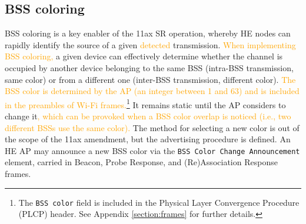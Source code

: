 \documentclass{ieeeaccess}
\begin{document}
\subsection{BSS coloring}	
\label{section:bss_coloring}	
BSS coloring is a key enabler of the 11ax SR operation, whereby HE nodes can rapidly identify the source of a given \textcolor{orange}{detected} transmission. \textcolor{orange}{When implementing BSS coloring,} a given device can effectively determine whether the channel is occupied by another device belonging to the same BSS (intra-BSS transmission, same color) or from a different one (inter-BSS transmission, different color). \textcolor{orange}{The BSS color is determined by the AP (an integer between 1 and 63) and is included in the preambles of Wi-Fi frames.}\footnote{The \texttt{BSS color} field is included in the Physical Layer Convergence Procedure (PLCP) header. See Appendix \ref{section:frames} for further details.} It remains static until the AP considers to change it\textcolor{orange}{, which can be provoked when a BSS color overlap is noticed (i.e., two different BSSs use the same color).} The method for selecting a new color is out of the scope of the 11ax amendment, but the advertising procedure is defined. An HE AP may announce a new BSS color via the \texttt{BSS Color Change Announcement} element, carried in Beacon, Probe Response, and (Re)Association Response frames. 

\end{document}
